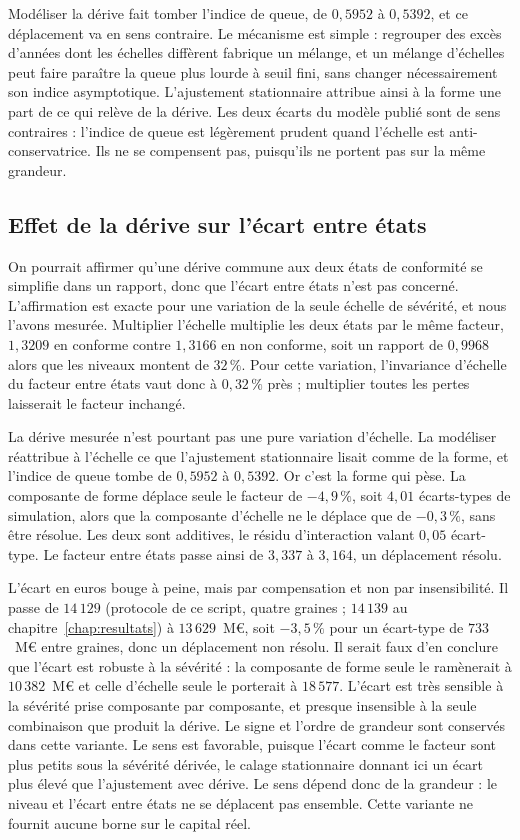 Modéliser la dérive fait tomber l'indice de queue, de $0{,}5952$ à $0{,}5392$, et ce déplacement va en sens
contraire. Le mécanisme est simple : regrouper des excès d'années dont les échelles diffèrent fabrique un
mélange, et un mélange d'échelles peut faire paraître la queue plus lourde à seuil fini, sans changer nécessairement son indice asymptotique.
L'ajustement stationnaire attribue ainsi à la forme une part de ce qui relève de la dérive. Les deux écarts du
modèle publié sont de sens contraires : l'indice de queue est légèrement prudent quand l'échelle est
anti-conservatrice. Ils ne se compensent pas, puisqu'ils ne portent pas sur la même grandeur.

\subsection{Effet de la dérive sur l'écart entre états}

On pourrait affirmer qu'une dérive commune aux deux états de conformité se simplifie dans un rapport, donc que
l'écart entre états n'est pas concerné. L'affirmation est exacte pour une variation de la seule échelle de sévérité,
et nous l'avons mesurée. Multiplier l'échelle multiplie les deux états par le même
facteur, $1{,}3209$ en conforme contre $1{,}3166$ en non conforme, soit un rapport de $0{,}9968$ alors que les
niveaux montent de $32\,\%$. Pour cette variation, l'invariance d'échelle du facteur entre états vaut donc à
$0{,}32\,\%$ près ; multiplier toutes les pertes laisserait le facteur inchangé.

La dérive mesurée n'est pourtant pas une pure variation d'échelle. La modéliser réattribue à l'échelle ce que
l'ajustement stationnaire lisait comme de la forme, et l'indice de queue tombe de $0{,}5952$ à $0{,}5392$. Or
c'est la forme qui pèse. La composante de forme déplace seule le facteur de $-4{,}9\,\%$, soit $4{,}01$
écarts-types de simulation, alors que la composante d'échelle ne le déplace que de $-0{,}3\,\%$, sans être
résolue. Les deux sont additives, le résidu d'interaction valant $0{,}05$ écart-type. Le facteur entre états
passe ainsi de $3{,}337$ à $3{,}164$, un déplacement résolu.

L'écart en euros bouge à peine, mais par compensation et non par insensibilité. Il passe de $14\,129$ (protocole de ce
script, quatre graines ; $14\,139$ au chapitre~\ref{chap:resultats}) à
$13\,629$~M\euro, soit $-3{,}5\,\%$ pour un écart-type de $733$~M\euro{} entre graines, donc un déplacement non
résolu. Il serait faux d'en conclure que l'écart est robuste à la sévérité : la composante de forme seule le
ramènerait à $10\,382$~M\euro{} et celle d'échelle seule le porterait à $18\,577$. L'écart est très sensible à la
sévérité prise composante par composante, et presque insensible à la seule combinaison que produit la dérive.
Le signe et l'ordre de grandeur sont conservés dans cette variante. Le sens est favorable, puisque l'écart
comme le facteur sont plus petits sous la sévérité dérivée, le calage stationnaire donnant ici un écart plus élevé que l'ajustement
avec dérive. Le sens dépend donc de la grandeur : le niveau et l'écart entre états ne se déplacent
pas ensemble. Cette variante ne fournit aucune borne sur le capital réel.

